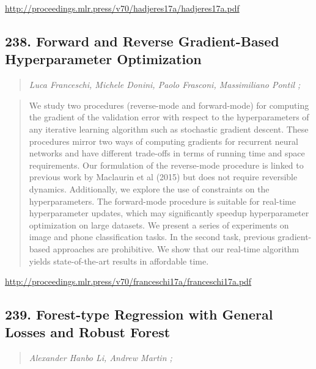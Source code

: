 \documentclass{article}
\begin{document}
\href{http://proceedings.mlr.press/v70/hadjeres17a/hadjeres17a.pdf}{http://proceedings.mlr.press/v70/hadjeres17a/hadjeres17a.pdf}

\subsection{238. Forward and Reverse Gradient-Based Hyperparameter Optimization}

\begin{quote}
\footnotesize{\textit{Luca Franceschi, Michele Donini, Paolo Frasconi, Massimiliano Pontil ;}}

\end{quote}

\begin{quote}
    We study two procedures (reverse-mode and forward-mode) for computing the gradient of the validation error with respect to the hyperparameters of any iterative learning algorithm such as stochastic gradient descent. These procedures mirror two ways of computing gradients for recurrent neural networks and have different trade-offs in terms of running time and space requirements. Our formulation of the reverse-mode procedure is linked to previous work by Maclaurin et al (2015) but does not require reversible dynamics. Additionally, we explore the use of constraints on the hyperparameters. The forward-mode procedure is suitable for real-time hyperparameter updates, which may significantly speedup hyperparameter optimization on large datasets. We present a series of experiments on image and phone classification tasks. In the second task, previous gradient-based approaches are prohibitive. We show that our real-time algorithm yields state-of-the-art results in affordable time.  
\end{quote}

\href{http://proceedings.mlr.press/v70/franceschi17a/franceschi17a.pdf}{http://proceedings.mlr.press/v70/franceschi17a/franceschi17a.pdf}

\subsection{239. Forest-type Regression with General Losses and Robust Forest}

\begin{quote}
\footnotesize{\textit{Alexander Hanbo Li, Andrew Martin ;}}

\end{quote}
\end{document}
